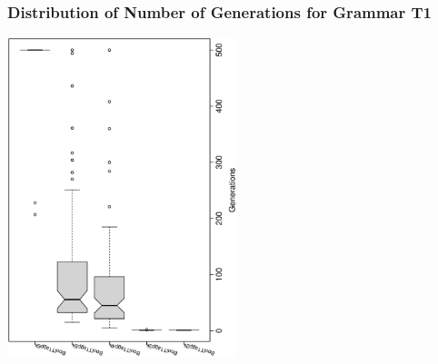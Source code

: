  \begin{frame}
 \frametitle{ Distribution of Number of Generations for Grammar T1 }
 \begin{center}
\includegraphics[width=0.5\textwidth, angle=-90]
{ExpBboxplottGenerations006.eps}
 \end{center}
 \label{ExpBboxplottGenerations006.eps}  
 \end{frame}

